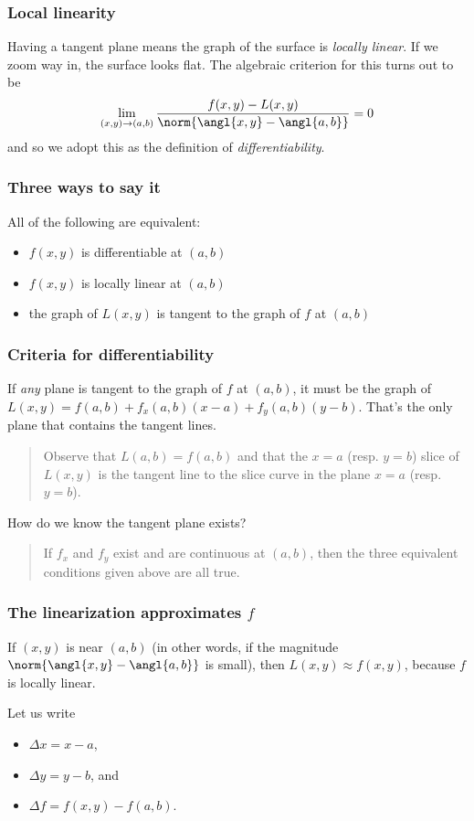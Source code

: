 \documentclass[11pt,ignorenonframetext,]{beamer}
\begin{document}
\begin{frame}\frametitle{Local linearity}

Having a tangent plane means the graph of the surface is \emph{locally
linear}. If we zoom way in, the surface looks flat. The algebraic
criterion for this turns out to be
\[ \lim_{(x, y) \to (a, b)} \frac{f(x, y) - L(x,y)}{\norm{\angl{x,y} - \angl{a,b}}} = 0\]
and so we adopt this as the definition of \emph{differentiability}.

\end{frame}

\begin{frame}\frametitle{Three ways to say it}

All of the following are equivalent:

\begin{itemize}[<+->]
\itemsep1pt\parskip0pt
\item
  $f(x,y)$ is differentiable at $(a,b)$
\item
  $f(x,y)$ is locally linear at $(a,b)$
\item
  the graph of $L(x,y)$ is tangent to the graph of $f$ at $(a,b)$
\end{itemize}

\end{frame}

\begin{frame}\frametitle{Criteria for differentiability}

If \emph{any} plane is tangent to the graph of $f$ at $(a,b)$, it must
be the graph of $L(x,y) = f(a,b) + f_x(a,b)(x-a) + f_y(a,b)(y - b)$.
That's the only plane that contains the tangent lines.

\begin{quote}
Observe that $L(a, b) = f(a, b)$ and that the $x = a$ (resp. $y = b$)
slice of $L(x,y)$ is the tangent line to the slice curve in the plane
$x = a$ (resp. $y = b$).
\end{quote}

How do we know the tangent plane exists?

\begin{quote}
If $f_x$ and $f_y$ exist and are continuous at $(a,b)$, then the three
equivalent conditions given above are all true.
\end{quote}

\end{frame}

\begin{frame}\frametitle{The linearization approximates $f$}

If $(x,y)$ is near $(a,b)$ (in other words, if the magnitude
$\norm{\angl{x,y} - \angl{a,b}}$ is small), then
$L(x,y) \approx f(x,y)$, because $f$ is locally linear.

Let us write

\begin{itemize}[<+->]
\itemsep1pt\parskip0pt
\item
  $\Delta x = x - a$,
\item
  $\Delta y = y - b$, and
\item
  $\Delta f = f(x,y) - f(a,b)$.
\end{itemize}

\end{frame}
\end{document}
